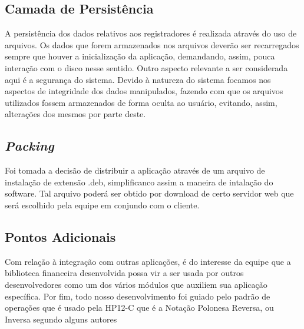 \subsection{Camada de Persistência}
A persistência dos dados relativos aos registradores é realizada através do uso de arquivos. Os dados que forem armazenados nos arquivos deverão ser recarregados sempre que houver a inicialização da aplicação, demandando, assim, pouca interação com o disco nesse sentido.
Outro aspecto relevante a ser considerada aqui é a segurança do sistema.  Devido à natureza do sistema focamos nos aspectos de integridade dos dados manipulados, fazendo com que os arquivos utilizados fossem armazenados de forma oculta ao usuário, evitando, assim, alterações dos mesmos por parte deste.

\subsection{\textit{Packing}}
Foi tomada a decisão de distribuir a aplicação através de um arquivo de instalação de extensão .deb, simplificanco assim a maneira de intalação do software. Tal arquivo poderá ser obtido por download de certo servidor web que será escolhido pela equipe em conjundo com o cliente.

\subsection{Pontos Adicionais}
Com relação à integração com outras aplicações, é do interesse da equipe que a biblioteca financeira desenvolvida possa vir a ser usada por outros desenvolvedores como um dos vários módulos que auxiliem sua aplicação específica.
Por fim, todo nosso desenvolvimento foi guiado pelo padrão de operações que é usado pela HP12-C que é a Notação Polonesa Reversa, ou Inversa segundo alguns autores \cite{NPR}





